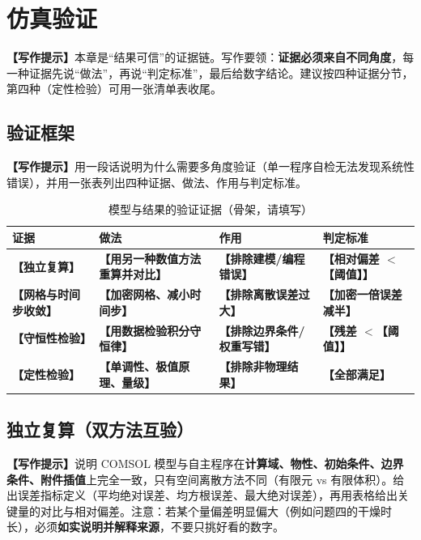 \documentclass[12pt,a4paper]{article}
\newcommand{\prompt}[1]{\par\noindent\textbf{【写作提示】}#1\par}      %
\newcommand{\ph}[1]{\textbf{【#1】}}                                   %
\begin{document}
\clearpage

\section{仿真验证}

\prompt{本章是“结果可信”的证据链。写作要领：\textbf{证据必须来自不同角度}，每一种证据先说“做法”，再说“判定标准”，最后给数字结论。建议按四种证据分节，第四种（定性检验）可用一张清单表收尾。}

\subsection{验证框架}

\prompt{用一段话说明为什么需要多角度验证（单一程序自检无法发现系统性错误），并用一张表列出四种证据、做法、作用与判定标准。}

\begin{table}[H]
\centering
\caption{模型与结果的验证证据（骨架，请填写）}
\label{tab:verify-frame}
\begin{tabular}{p{2.6cm}p{5.0cm}p{3.0cm}p{3.8cm}}
\toprule
证据 & 做法 & 作用 & 判定标准\\
\midrule
\ph{独立复算} & \ph{用另一种数值方法重算并对比} & \ph{排除建模/编程错误} & \ph{相对偏差 $<$\ph{阈值}}\\
\ph{网格与时间步收敛} & \ph{加密网格、减小时间步} & \ph{排除离散误差过大} & \ph{加密一倍误差减半}\\
\ph{守恒性检验} & \ph{用数据检验积分守恒律} & \ph{排除边界条件/权重写错} & \ph{残差 $<$\ph{阈值}}\\
\ph{定性检验} & \ph{单调性、极值原理、量级} & \ph{排除非物理结果} & \ph{全部满足}\\
\bottomrule
\end{tabular}
\end{table}

\subsection{独立复算（双方法互验）}

\prompt{说明 COMSOL 模型与自主程序在\textbf{计算域、物性、初始条件、边界条件、附件插值}上完全一致，只有空间离散方法不同（有限元 vs 有限体积）。给出误差指标定义（平均绝对误差、均方根误差、最大绝对误差），再用表格给出关键量的对比与相对偏差。注意：若某个量偏差明显偏大（例如问题四的干燥时长），必须\textbf{如实说明并解释来源}，不要只挑好看的数字。}
\end{document}

